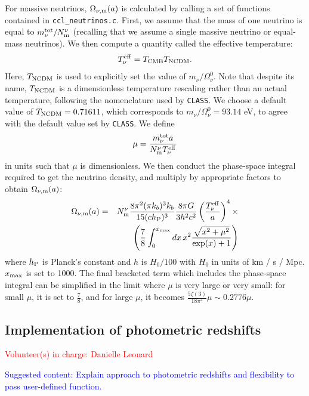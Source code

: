 \documentclass[\docopts]{\docclass}
\newcommand{\vol}[1]{\textcolor{red}{Volunteer(s) in charge: #1}}
\newcommand{\cont}[1]{\textcolor{blue}{Suggested content: #1}}
\begin{document}
For massive neutrinos, $\Omega_{\nu, {\rm m}}(a)$ is calculated by calling a set of functions contained in {\tt ccl\_neutrinos.c}. First, we assume that the mass of one neutrino is equal to $m_{\nu}^{\rm tot} / N_{\rm m}^{\nu}$ (recalling that we assume a single massive neutrino or equal-mass neutrinos). We then compute a quantity called the effective temperature:
\begin{equation}
T_{\nu}^{\rm eff} = T_{\rm CMB} T_{\rm NCDM}.
\label{Tnueff}
\end{equation}
Here, $T_{\rm NCDM}$ is used to explicitly set the value of $m_{\nu} / \Omega_{\nu}^0$. Note that despite its name, $T_{\rm NCDM}$ is a dimensionless temperature rescaling rather than an actual temperature, following the nomenclature used by {\tt CLASS}. We choose a default value of $T_{\rm NCDM} = 0.71611$, which corresponds to $m_{\nu} / \Omega_{\nu}^0 = 93.14$ eV, to agree with the default value set by {\tt CLASS}. We define 
\begin{equation}
\mu = \frac{m_{\nu}^{\rm tot}a}{N_{\rm m}^\nu T_{\nu}^{\rm eff}}
\label{mnuOT}
\end{equation}
in units such that $\mu$ is dimensionless. We then conduct the phase-space integral required to get the neutrino density, and multiply by appropriate factors to obtain $\Omega_{\nu, {\rm m}}(a)$:
\begin{eqnarray}
  \Omega_{\nu, {\rm m}}(a) &=& N_{\rm m}^\nu \frac{8 \pi^2(\pi k_b )^3 k_b}{15(c h_{\rm P})^3} \frac{8 \pi G}{3h^2c^2} \left(\frac{T_{\nu}^{\rm eff}}{a}\right)^4 \times\nonumber\\
  && \left(\frac{7}{8}\int_0^{x_{\rm max}} dx \, x^2 \frac{\sqrt{x^2 + \mu^2}}{\exp(x) + 1}\right)
\label{Omnu}
\end{eqnarray}
where $h_{\rm P}$ is Planck's constant and $h$ is $H_0/100$ with $H_0$ in units of km / s / Mpc. $x_{\rm max}$ is set to 1000. The final bracketed term which includes the phase-space integral can be simplified in the limit where $\mu$ is very large or very small: for small $\mu$, it is set to $\frac{7}{8}$, and for large $\mu$, it becomes $\frac{5\zeta(3)}{18\pi^4}\mu\sim 0.2776\mu$.


\subsection{Implementation of photometric redshifts}
\vol{Danielle Leonard}

\cont{Explain approach to photometric redshifts and flexibility to pass user-defined function.}
\end{document}
